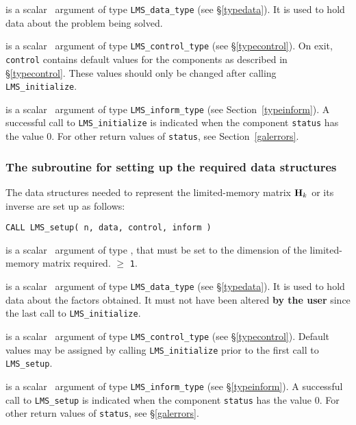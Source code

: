 \documentclass{galahad}
\newcommand{\packagename}{LMS}
\begin{document}
\vspace*{-3mm}
\begin{description}

 is a scalar \intentinout\ argument of type
{\tt \packagename\_data\_type}
(see \S\ref{typedata}). It is used to hold data about the problem being
solved.

 is a scalar \intentout\ argument of type
{\tt \packagename\_control\_type}
(see \S\ref{typecontrol}).
On exit, {\tt control} contains default values for the components as
described in \S\ref{typecontrol}.
These values should only be changed after calling
{\tt \packagename\_initialize}.

 is a scalar \intentout\ argument of type
{\tt \packagename\_inform\_type}
(see Section~\ref{typeinform}). A successful call to
{\tt \packagename\_initialize}
is indicated when the  component {\tt status} has the value 0.
For other return values of {\tt status}, see Section~\ref{galerrors}.

\end{description}


\subsubsection{The subroutine for setting up the required data structures}
The data structures needed to represent the limited-memory matrix ${\mathbf{H}}_k$
or its inverse are set up as follows:
\vspace*{1mm}

\hspace{8mm}
{\tt CALL \packagename\_setup(  n, data, control, inform )}

\vspace*{-3mm}
\begin{description}
 is a scalar \intentin\ argument of type \integer,
that must be set to the dimension of the limited-memory matrix required.
 $\geq$ {\tt 1}.

 is a scalar \intentinout\ argument of type
{\tt \packagename\_data\_type}
(see \S\ref{typedata}). It is used to hold data about the factors obtained.
It must not have been altered {\bf by the user} since the last call to
{\tt \packagename\_initialize}.

 is a scalar \intentin\ argument of type
{\tt \packagename\_control\_type}
(see \S\ref{typecontrol}). Default values may be assigned by calling
{\tt \packagename\_initialize} prior to the first call to
{\tt \packagename\_setup}.

 is a scalar \intentout\ argument of type
{\tt \packagename\_inform\_type}
(see \S\ref{typeinform}). A successful call to
{\tt \packagename\_setup}
is indicated when the  component {\tt status} has the value 0.
For other return values of {\tt status}, see \S\ref{galerrors}.

\end{description}
\end{document}
